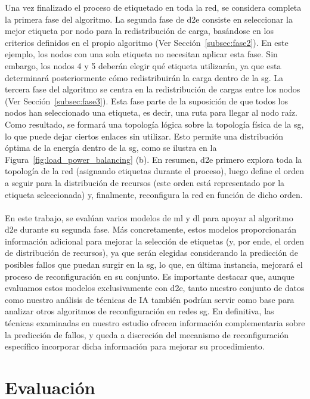 Una vez finalizado el proceso de etiquetado en toda la red, se considera completa la primera fase del algoritmo. La segunda fase de \gls{d2e} consiste en seleccionar la mejor etiqueta por nodo para la redistribución de carga, basándose en los criterios definidos en el propio algoritmo (Ver Sección~\ref{subsec:fase2}). En este ejemplo, los nodos con una sola etiqueta no necesitan aplicar esta fase. Sin embargo, los nodos 4 y 5 deberán elegir qué etiqueta utilizarán, ya que esta determinará posteriormente cómo redistribuirán la carga dentro de la \gls{sg}. La tercera fase del algoritmo se centra en la redistribución de cargas entre los nodos (Ver Sección~\ref{subsec:fase3}). Esta fase parte de la suposición de que todos los nodos han seleccionado una etiqueta, es decir, una ruta para llegar al nodo raíz. Como resultado, se formará una topología lógica sobre la topología física de la \gls{sg}, lo que puede dejar ciertos enlaces sin utilizar. Esto permite una distribución óptima de la energía dentro de la \gls{sg}, como se ilustra en la Figura~\ref{fig:load_power_balancing} (b). En resumen, \gls{d2e} primero explora toda la topología de la red (asignando etiquetas durante el proceso), luego define el orden a seguir para la distribución de recursos (este orden está representado por la etiqueta seleccionada) y, finalmente, reconfigura la red en función de dicho orden.\\
\\
En este trabajo, se evalúan varios modelos de \gls{ml} y \gls{dl} para apoyar al algoritmo \gls{d2e} durante su segunda fase. Más concretamente, estos modelos proporcionarán información adicional para mejorar la selección de etiquetas (y, por ende, el orden de distribución de recursos), ya que serán elegidas considerando la predicción de posibles fallos que puedan surgir en la \gls{sg}, lo que, en última instancia, mejorará el proceso de reconfiguración en su conjunto. Es importante destacar que, aunque evaluamos estos modelos exclusivamente con \gls{d2e}, tanto nuestro conjunto de datos como nuestro análisis de técnicas de IA también podrían servir como base para analizar otros algoritmos de reconfiguración en redes \gls{sg}. En definitiva, las técnicas examinadas en nuestro estudio ofrecen información complementaria sobre la predicción de fallos, y queda a discreción del mecanismo de reconfiguración específico incorporar dicha información para mejorar su procedimiento.

\section{Evaluación}

